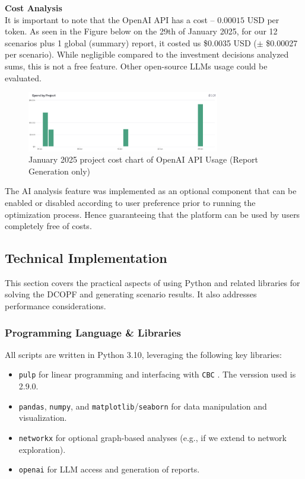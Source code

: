 \textbf{Cost Analysis} \\
It is important to note that the OpenAI API has a cost -- $0.00015$ USD per token. As seen in the Figure below on 
the 29th of January 2025, for our 12 scenarios plus 1 global (summary) report, it costed us \$0.0035 USD 
($\pm$ \$0.00027 per scenario). While negligible compared to the investment decisions analyzed sums, this is not 
a free feature. Other open-source LLMs usage could be evaluated.

\begin{figure}[H]
    \centering
    \includegraphics[width=0.75\textwidth]{images/api-cost.png}
    \caption{January 2025 project cost chart of OpenAI API Usage (Report Generation only)}
    \label{fig:api-cost}
\end{figure}

The AI analysis feature was implemented as an optional component that can be enabled or disabled according to user 
preference prior to running the optimization process. Hence guaranteeing that the platform can be used by users 
completely free of costs.


\subsection{Technical Implementation}
\label{sec:technical_implementation}

This section covers the practical aspects of using Python and related libraries for solving the 
DCOPF and generating scenario results. It also addresses performance considerations.

\subsubsection{Programming Language \& Libraries}
\label{sec:programming_libraries}

All scripts are written in Python 3.10, leveraging the following key libraries:
\begin{itemize}
  \item \texttt{pulp} for linear programming and interfacing with \texttt{CBC} \cite{forrest2018cbc}. The verssion used is 2.9.0.
  \item \texttt{pandas}, \texttt{numpy}, and \texttt{matplotlib}/\texttt{seaborn} for data manipulation and
  visualization.
  \item \texttt{networkx} for optional graph-based analyses (e.g., if we extend to network exploration).
  \item \texttt{openai} for LLM access and generation of reports.
\end{itemize}


